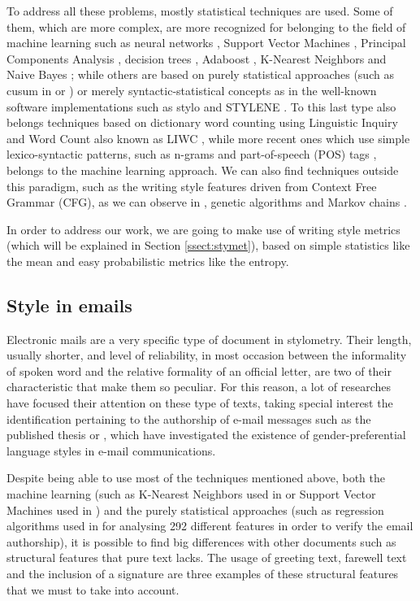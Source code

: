 To address all these problems, mostly statistical techniques are used. Some of them, which are more complex, are more recognized for belonging to the field of machine learning such as neural networks \citep{ng1997feature}, Support Vector Machines \citep{abbasi2005applying}, Principal Components Analysis \citep{PCAstyle}, decision trees \citep{apte1998text}, Adaboost \citep{cheng2011author}, K-Nearest Neighbors \citep{kucukyilmaz2008chat} and Naive Bayes \citep{sahami1998bayesian}; while others are based on purely statistical approaches (such as cusum in \cite{summers1999analysing} or \cite{thisted1987did}) or merely syntactic-statistical concepts as in the well-known software implementations such as stylo \citep{stylor} and STYLENE \citep{stylene}. To this last type also belongs techniques based on dictionary word counting using Linguistic Inquiry and Word Count also known as LIWC \citep{liwc2015}, while more recent ones which use simple lexico-syntactic patterns, such as n-grams and part-of-speech (POS) tags \citep{mihalcea2009lie, ott2011finding}, belongs to the machine learning approach. We can also find techniques outside this paradigm, such as the writing style features driven from Context Free Grammar (CFG), as we can observe in \cite{cfgstylo}, genetic algorithms \citep{holmes1995federalist} and Markov chains \citep{tweedie1998variable}.

In order to address our work, we are going to make use of writing style metrics (which will be explained in Section \ref{ssect:stymet}), based on simple statistics like the mean and easy probabilistic metrics like the entropy.

\subsection{Style in emails}\label{ssect:styloemail}
Electronic mails are a very specific type of document in stylometry. Their length, usually shorter, and level of reliability, in most occasion between the informality of spoken word and the relative formality of an official letter, are two of their characteristic that make them so peculiar. For this reason, a lot of researches have focused their attention on these type of texts, taking special interest the identification pertaining to the authorship of e-mail messages such as the published thesis \cite{corney2003analysing} or \cite{thomson2001predicting}, which have investigated the existence of gender-preferential language styles in e-mail communications.

Despite being able to use most of the techniques mentioned above, both the machine learning (such as K-Nearest Neighbors used in \cite{calix2008stylometry} or Support Vector Machines used in \cite{de2001mining}) and the purely statistical approaches (such as regression algorithms used in \cite{iqbal2010mining} for analysing 292 different features in order to verify the email authorship), it is possible to find big differences with other documents such as structural features that pure text lacks. The usage of greeting text, farewell text and the inclusion of a signature are three examples of these structural features that we must to take into account.

